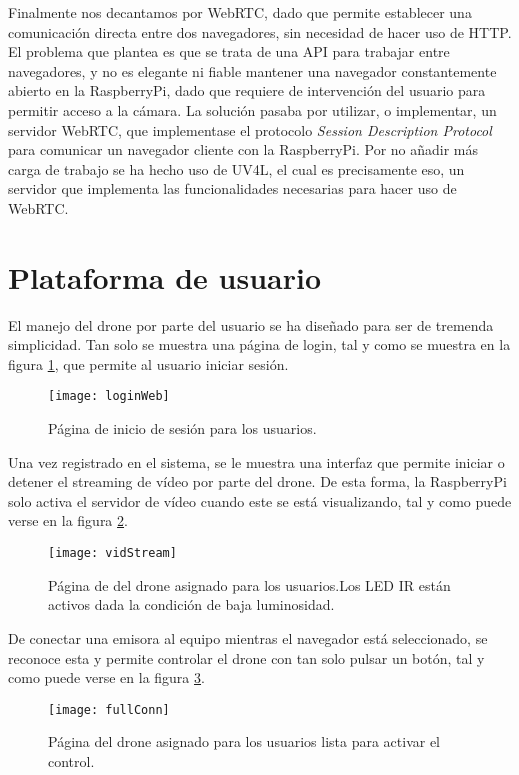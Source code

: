 Finalmente nos decantamos por WebRTC, dado que permite establecer una comunicación directa entre dos navegadores, sin necesidad de hacer uso de HTTP. El problema que plantea es que se trata de una API para trabajar entre navegadores, y no es elegante ni fiable mantener una navegador constantemente abierto en la RaspberryPi, dado que requiere de intervención del usuario para permitir acceso a la cámara. 
La solución pasaba por utilizar, o implementar, un servidor WebRTC, que implementase el protocolo \emph{Session Description Protocol} para comunicar un navegador cliente con la RaspberryPi. Por no añadir más carga de trabajo se ha hecho uso de UV4L, el cual es precisamente eso, un servidor que implementa las funcionalidades necesarias para hacer uso de WebRTC.

\section{Plataforma de usuario}

El manejo del drone por parte del usuario se ha diseñado para ser de tremenda simplicidad. 
Tan solo se muestra una página de login, tal y como se muestra en la figura \ref{fig:login}, que permite al usuario iniciar sesión. 

\begin{figure}[H]
	\centering
	\texttt{[image: loginWeb]}
	\caption[Página de Login]{Página de inicio de sesión para los usuarios.}\label{fig:login}
\end{figure}

Una vez registrado en el sistema, se le muestra una interfaz que permite iniciar o detener el streaming de vídeo por parte del drone. De esta forma, la RaspberryPi solo activa el servidor de vídeo cuando este se está visualizando, tal y como puede verse en la figura \ref{fig:vidStream}. 
\begin{figure}[H]
	\centering
	\texttt{[image: vidStream]}
	\caption[Página de control]{Página de del drone asignado para los usuarios.Los LED IR están activos dada la condición de baja luminosidad.}\label{fig:vidStream}
\end{figure}

De conectar una emisora al equipo mientras el navegador está seleccionado, se reconoce esta y permite controlar el drone con tan solo pulsar un botón, tal y como puede verse en la figura \ref{fig:fullConn}.

\begin{figure}[H]
	\centering
	\texttt{[image: fullConn]}
	\caption[Página de control y emisora]{Página del drone asignado para los usuarios lista para activar el control.}\label{fig:fullConn}
\end{figure}

